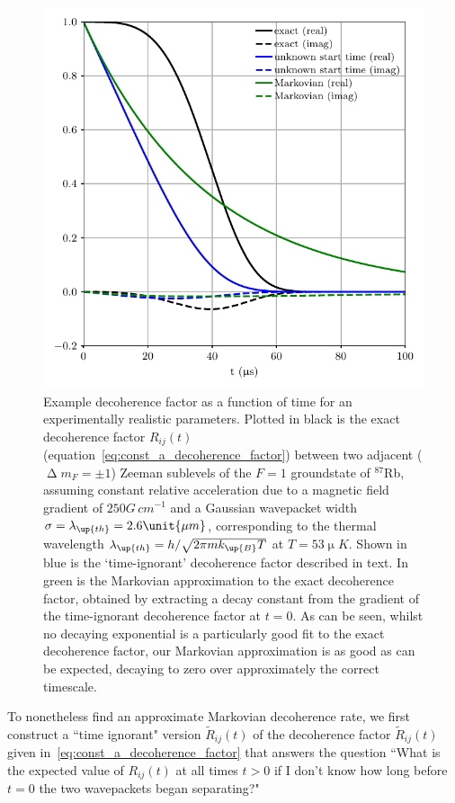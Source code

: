 \begin{figure}[t]
    \centerfloat
    \includegraphics{figures/hidden_variables/decoherence_factor_example.pdf}
    \caption{Example decoherence factor as a function of time for an experimentally realistic parameters. Plotted in black is the exact decoherence factor $R_{ij}(t)$ (equation~\eqref{eq:const_a_decoherence_factor}) between two adjacent ($\upDelta m_F = \pm 1$) Zeeman sublevels of the $F=1$ groundstate of $^{87}$Rb, assuming constant relative acceleration due to a magnetic field gradient of $250\unit{G\,cm}^{-1}$ and a Gaussian wavepacket width $\sigma=\lambda_\up{th} = 2.6\unit{\mu m}$, corresponding to the thermal wavelength $\lambda_\up{th} = h/\sqrt{2\pi m k_\up{B} T}$ at $T=53\unit{\upmu K}$. Shown in blue is the `time-ignorant' decoherence factor described in text. In green is the Markovian approximation to the exact decoherence factor, obtained by extracting a decay constant from the gradient of the time-ignorant decoherence factor at $t=0$. As can be seen, whilst no decaying exponential is a particularly good fit to the exact decoherence factor, our Markovian approximation is as good as can be expected, decaying to zero over approximately the correct timescale.}
    \label{fig:decoherence_factor_example}
\end{figure}

To nonetheless find an approximate Markovian decoherence rate, we first construct a ``time ignorant" version $\tilde R_{ij}(t)$ of the decoherence factor $\tilde R_{ij}(t)$ given in~\eqref{eq:const_a_decoherence_factor} that answers the question ``What is the expected value of $R_{ij}(t)$ at all times $t > 0$ if I don't know how long before $t=0$ the two wavepackets began separating?" 

